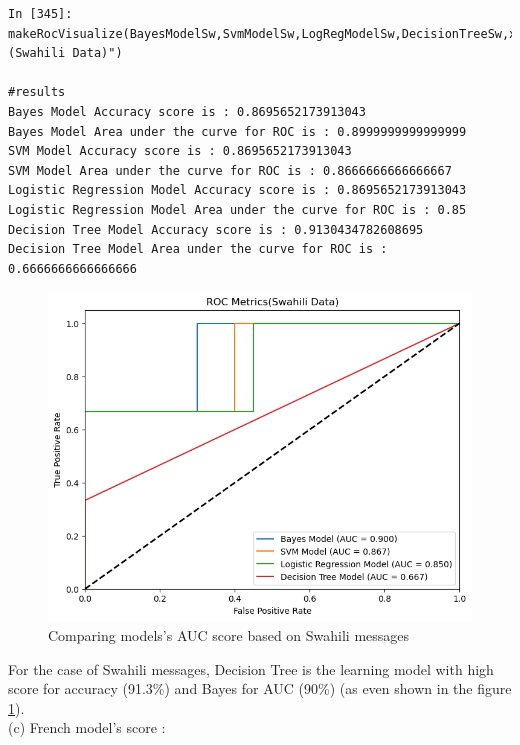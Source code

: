 \documentclass[12pt,a4paper, oneside]{book}
\begin{document}
\begin{lstlisting}[style=stylejupyter]
In [345]: makeRocVisualize(BayesModelSw,SvmModelSw,LogRegModelSw,DecisionTreeSw,x_test_features_sw,y_test_sw,"(Swahili Data)")

#results 
Bayes Model Accuracy score is : 0.8695652173913043
Bayes Model Area under the curve for ROC is : 0.8999999999999999
SVM Model Accuracy score is : 0.8695652173913043
SVM Model Area under the curve for ROC is : 0.8666666666666667
Logistic Regression Model Accuracy score is : 0.8695652173913043
Logistic Regression Model Area under the curve for ROC is : 0.85
Decision Tree Model Accuracy score is : 0.9130434782608695
Decision Tree Model Area under the curve for ROC is : 0.6666666666666666
\end{lstlisting}  
\begin{figure}
	\centering
	\includegraphics[width=0.9\linewidth]{CollectImages/rocSwahili}
	\caption{Comparing models's AUC score based on Swahili messages}
	\label{fig:rocswahili}
\end{figure}

For the case of Swahili messages, Decision Tree is the learning model with high score for accuracy (91.3\%) and Bayes for AUC (90\%)  (as even shown in the figure \ref{fig:rocswahili}).
\\

(c) French model's score :
\end{document}
